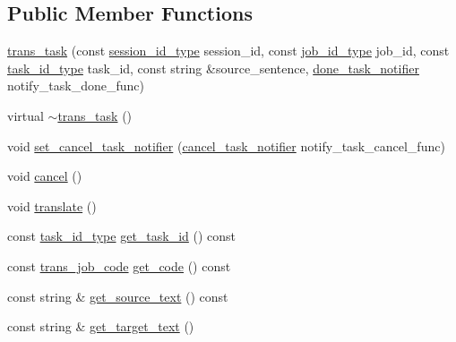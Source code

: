 \subsection*{Public Member Functions}
\begin{DoxyCompactItemize}
\item 
\hyperlink{classuva_1_1smt_1_1bpbd_1_1server_1_1trans__task_a0fa8eacb72332e4a4e2ee8f76b286dfd}{trans\+\_\+task} (const \hyperlink{namespaceuva_1_1smt_1_1bpbd_1_1common_1_1messaging_a17ad17f94b78abb87ab5f3f3d6f09588}{session\+\_\+id\+\_\+type} session\+\_\+id, const \hyperlink{namespaceuva_1_1smt_1_1bpbd_1_1common_1_1messaging_af12d41e7490214ac057969e9d4af1436}{job\+\_\+id\+\_\+type} job\+\_\+id, const \hyperlink{namespaceuva_1_1smt_1_1bpbd_1_1server_a67f8b384118030b4ae63f1239253f9ed}{task\+\_\+id\+\_\+type} task\+\_\+id, const string \&source\+\_\+sentence, \hyperlink{classuva_1_1smt_1_1bpbd_1_1server_1_1trans__task_a0bbeddd9f0896c3ecb32ed4c2c5e66e1}{done\+\_\+task\+\_\+notifier} notify\+\_\+task\+\_\+done\+\_\+func)
\item 
virtual \hyperlink{classuva_1_1smt_1_1bpbd_1_1server_1_1trans__task_aa1bb5790e96aa17e38dc8b5ece08e961}{$\sim$trans\+\_\+task} ()
\item 
void \hyperlink{classuva_1_1smt_1_1bpbd_1_1server_1_1trans__task_ad1a21a8c197d2fe7d23963ab0fda85b4}{set\+\_\+cancel\+\_\+task\+\_\+notifier} (\hyperlink{classuva_1_1smt_1_1bpbd_1_1server_1_1trans__task_aa3ee37277c0d0fd6ffdb44b67f1a5384}{cancel\+\_\+task\+\_\+notifier} notify\+\_\+task\+\_\+cancel\+\_\+func)
\item 
void \hyperlink{classuva_1_1smt_1_1bpbd_1_1server_1_1trans__task_afb1b79f1939721f90458ae41e6775325}{cancel} ()
\item 
void \hyperlink{classuva_1_1smt_1_1bpbd_1_1server_1_1trans__task_adfc46fc066c24a06a0e455e640c36904}{translate} ()
\item 
const \hyperlink{namespaceuva_1_1smt_1_1bpbd_1_1server_a67f8b384118030b4ae63f1239253f9ed}{task\+\_\+id\+\_\+type} \hyperlink{classuva_1_1smt_1_1bpbd_1_1server_1_1trans__task_a7c4fb56a5ad154a01e0b1ce3224029ae}{get\+\_\+task\+\_\+id} () const 
\item 
const \hyperlink{classuva_1_1smt_1_1bpbd_1_1common_1_1messaging_1_1trans__job__code}{trans\+\_\+job\+\_\+code} \hyperlink{classuva_1_1smt_1_1bpbd_1_1server_1_1trans__task_a7989069b2c8ac4a53c4b61cfb7ca2ae9}{get\+\_\+code} () const 
\item 
const string \& \hyperlink{classuva_1_1smt_1_1bpbd_1_1server_1_1trans__task_a6207deffc6fece01ae5fe55f14da31f9}{get\+\_\+source\+\_\+text} () const 
\item 
const string \& \hyperlink{classuva_1_1smt_1_1bpbd_1_1server_1_1trans__task_a6b6e12de683ef6ec75ae3d2ef53c4845}{get\+\_\+target\+\_\+text} ()
\end{DoxyCompactItemize}
